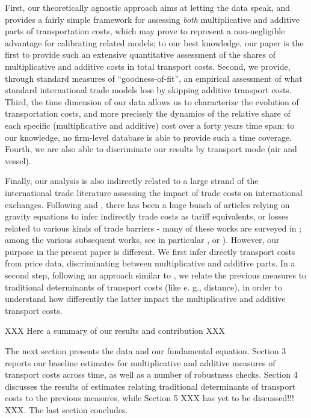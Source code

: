 \documentclass[a4paper,11pt]{article}
\begin{document}
First, our theoretically agnostic approach aims at letting the data speak, and provides a fairly simple framework for assessing \emph{both} multiplicative and additive parts of transportation costs, which may prove to represent a non-negligible advantage for calibrating related models; to our best knowledge, our paper is the first to provide such an extensive quantitative assessment of the shares of multiplicative and additive costs in total transport costs. Second, we provide, through standard measures of ``goodness-of-fit'', an empirical assessment of what standard international trade models lose by skipping additive transport costs. Third, the time dimension of our data allows us to characterize the evolution of transportation costs, and more precisely the dynamics of the relative share of each specific (multiplicative and additive) cost over a forty years time span; to our knowledge, no firm-level database is able to provide such a time coverage. Fourth, we are also able to discriminate our results by transport mode (air and vessel).

Finally, our analysis is also indirectly related to a large strand of the international trade literature assessing the impact of trade costs on international exchanges. Following \citet{anderson_wincoop} and \citet{anderson_wincoop_jel}, there has been a huge bunch of articles relying on gravity equations to infer indirectly trade costs as tariff equivalents, or losses related to various kinds of trade barriers - many of these works are surveyed in \citet{anderson_wincoop}; among the various subsequent works, see in particular \citet{anderson_yotov}, \citet{novy13} or \citealp{chen_novy}). However, our purpose in the present paper is different. We first infer directly transport costs from price data, discriminating between multiplicative and additive parts. In a second step, following an approach similar to \citet{Behar_Venables}, we relate the previous measures to traditional determinants of transport costs (like e. g., distance), in order to understand how differently the latter impact the multiplicative and additive transport costs.



XXX Here a summary of our results and contribution XXX

The next section presents the data and our fundamental equation. Section 3 reports our baseline estimates for multiplicative and additive measures of transport costs across time, as well as a number of robustness checks. Section 4 discusses the results of estimates relating traditional determinants of transport costs to the previous measures, while Section 5 XXX has yet to be discussed!!! XXX. The last section concludes.
\end{document}
